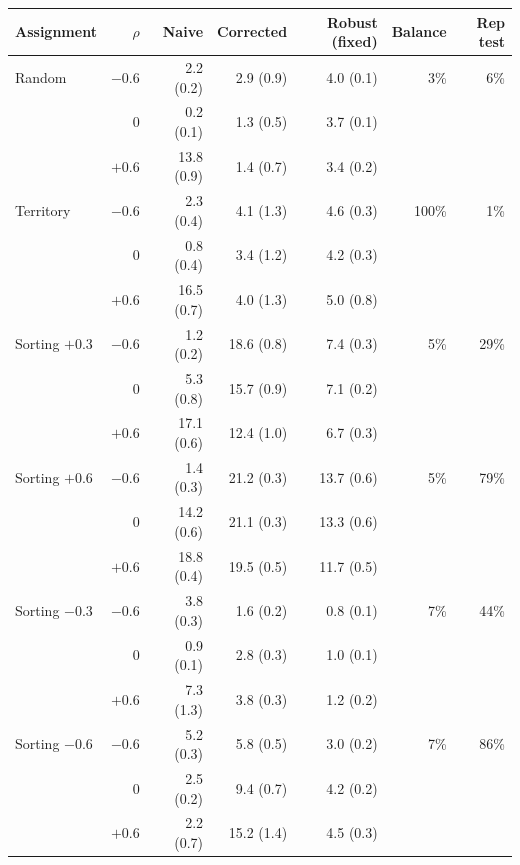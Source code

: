 \begin{tabular}{lrrrrrr}
\toprule
Assignment & $\rho$ & Naive & Corrected & Robust (fixed) & Balance & Rep test \\
\midrule
Random & $-0.6$ & 2.2 (0.2) & 2.9 (0.9) & 4.0 (0.1) & 3\% & 6\% \\
 & 0 & 0.2 (0.1) & 1.3 (0.5) & 3.7 (0.1) &  &  \\
 & $+0.6$ & 13.8 (0.9) & 1.4 (0.7) & 3.4 (0.2) &  &  \\
\midrule
Territory & $-0.6$ & 2.3 (0.4) & 4.1 (1.3) & 4.6 (0.3) & 100\% & 1\% \\
 & 0 & 0.8 (0.4) & 3.4 (1.2) & 4.2 (0.3) &  &  \\
 & $+0.6$ & 16.5 (0.7) & 4.0 (1.3) & 5.0 (0.8) &  &  \\
\midrule
Sorting $+0.3$ & $-0.6$ & 1.2 (0.2) & 18.6 (0.8) & 7.4 (0.3) & 5\% & 29\% \\
 & 0 & 5.3 (0.8) & 15.7 (0.9) & 7.1 (0.2) &  &  \\
 & $+0.6$ & 17.1 (0.6) & 12.4 (1.0) & 6.7 (0.3) &  &  \\
\midrule
Sorting $+0.6$ & $-0.6$ & 1.4 (0.3) & 21.2 (0.3) & 13.7 (0.6) & 5\% & 79\% \\
 & 0 & 14.2 (0.6) & 21.1 (0.3) & 13.3 (0.6) &  &  \\
 & $+0.6$ & 18.8 (0.4) & 19.5 (0.5) & 11.7 (0.5) &  &  \\
\midrule
Sorting $-0.3$ & $-0.6$ & 3.8 (0.3) & 1.6 (0.2) & 0.8 (0.1) & 7\% & 44\% \\
 & 0 & 0.9 (0.1) & 2.8 (0.3) & 1.0 (0.1) &  &  \\
 & $+0.6$ & 7.3 (1.3) & 3.8 (0.3) & 1.2 (0.2) &  &  \\
\midrule
Sorting $-0.6$ & $-0.6$ & 5.2 (0.3) & 5.8 (0.5) & 3.0 (0.2) & 7\% & 86\% \\
 & 0 & 2.5 (0.2) & 9.4 (0.7) & 4.2 (0.2) &  &  \\
 & $+0.6$ & 2.2 (0.7) & 15.2 (1.4) & 4.5 (0.3) &  &  \\
\bottomrule
\end{tabular}

